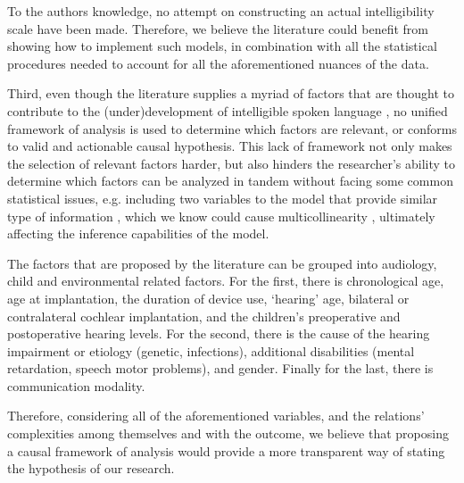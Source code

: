 To the authors knowledge, no attempt on constructing an actual intelligibility scale have been made. Therefore, we believe the literature could benefit from showing how to implement such models, in combination with all the statistical procedures needed to account for all the aforementioned nuances of the data.

Third, even though the literature supplies a myriad of factors that are thought to contribute to the (under)development of intelligible spoken language \cite{Boons_et_al_2012, Gillis_2018, Fagan_et_al_2020, Niparko_et_al_2010}, no unified framework of analysis is used to determine which factors are relevant, or conforms to valid and actionable causal hypothesis. This lack of framework not only makes the selection of relevant factors harder, but also hinders the researcher's ability to determine which factors can be analyzed in tandem without facing some common statistical issues, e.g. including two variables to the model that provide similar type of information \cite{Boonen_et_al_2021}, which we know could cause multicollinearity \cite{Farrar_et_al_1967}, ultimately affecting the inference capabilities of the model. 

The factors that are proposed by the literature can be grouped into audiology, child and environmental related factors. For the first, there is chronological age, age at implantation, the duration of device use, `hearing' age, bilateral or contralateral cochlear implantation, and the children's preoperative and postoperative hearing levels. For the second, there is the cause of the hearing impairment or etiology (genetic, infections), additional disabilities (mental retardation, speech motor problems), and gender. Finally for the last, there is communication modality.  

Therefore, considering all of the aforementioned variables, and the relations' complexities among themselves and with the outcome, we believe that proposing a causal framework of analysis would provide a more transparent way of stating the hypothesis of our research.

